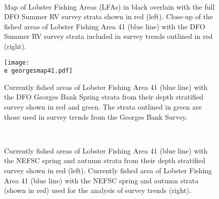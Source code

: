 \documentclass[11pt]{article}
\newcommand{\D}{.}
\newcommand{\e}{/backup/bio_data/bio.lobster/figures/} %
\begin{document}
\begin{landscape}

\begin{figure}
\centering
{}
\\
\caption{ Map of Lobster Fishing Areas (LFAs) in black overlain with the full DFO Summer RV survey strata shown in red (left). Close-up of the fished areas of Lobster Fishing Area 41 (blue line) with the DFO Summer RV survey strata included in survey trends outlined in red (right).}
\end{figure}

\end{landscape}
\begin{figure}

    \texttt{[image: \\e georgesmap41.pdf]}
    \caption{Currently fished areas of Lobster Fishing Area 41 (blue line) with the DFO Georges Bank Spring strata from their depth stratified survey shown in red and green. The strata outlined in green are those used in survey trends from the Georges Bank Survey.}

\end{figure}

\begin{landscape}
\begin{figure}
\centering
{}
\\
\caption{ Currently fished areas of Lobster Fishing Area 41 (blue line) with the NEFSC spring and autumn strata from their depth stratified survey shown in red (left). Currently fished area of Lobster Fishing Area 41 (blue line) with the NEFSC spring and autumn strata (shown in red) used for the analysis of survey trends (right).}
\end{figure}


\end{landscape}
\end{document}
